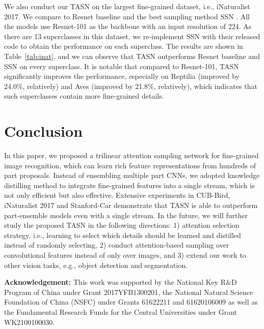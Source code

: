 \documentclass[10pt,twocolumn,letterpaper]{article}
\begin{document}
We also conduct our TASN on the largest fine-grained dataset, i.e., iNaturalist 2017. We compare to Resnet \cite{ResNet} baseline and the best sampling method SSN \cite{recasens2018learning}. All the models use Resnet-101 as the backbone with an input resolution of 224. As there are 13 superclasses in this dataset, we re-implement SSN \cite{recasens2018learning} with their released code to obtain the performance on each superclass. The results are shown in Table~\ref{tab:inat}, and we can observe that TASN outperforms Resnet baseline and SSN on every superclass. It is notable that compared to Resnet-101, TASN significantly improves the performance, especially on Reptilia (improved by 24.0\%, relatively) and Aves (improved by 21.8\%, relatively), which indicates that such superclasses contain more fine-grained details.
\vspace{-2 mm}
\section{Conclusion}
\label{con}
In this paper, we proposed a trilinear attention sampling network for fine-grained image recognition, which can learn rich feature representations from hundreds of part proposals. Instead of ensembling multiple part CNNs, we adopted knowledge distilling method to integrate fine-grained features into a single stream, which is not only efficient but also effective. Extensive experiments in CUB-Bird, iNaturalist 2017 and Stanford-Car demonstrate that TASN is able to outperform part-ensemble models even with a single stream. In the future, we will further study the proposed TASN in the following directions: 1) attention selection strategy, i.e., learning to select which details should be learned and distilled instead of randomly selecting, 2) conduct attention-based sampling over convolutional features instead of only over images, and 3) extend our work to other vision tasks, e.g., object detection and segmentation.

\textbf{Acknowledgement:} This work was supported by the National Key R\&D Program of China under Grant 2017YFB1300201, the National Natural Science Foundation of China (NSFC) under Grants 61622211 and 61620106009 as well as the Fundamental Research Funds for the Central Universities under Grant WK2100100030.

{\small


}
\end{document}
